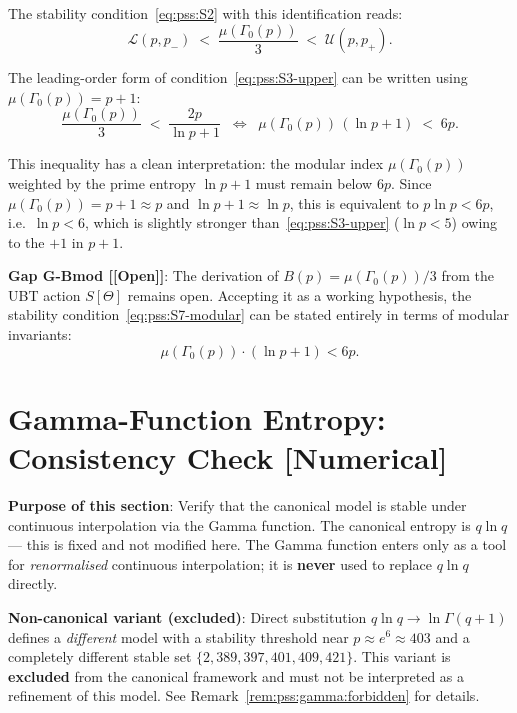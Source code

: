 \documentclass[12pt,a4paper]{article}
\theoremstyle{definition}
\theoremstyle{remark}
\newcommand{\OPEN}{\textbf{[Open]}}
\begin{document}
The stability condition~\eqref{eq:pss:S2} with this identification reads:
\[
  \mathcal{L}(p,p_-) \;<\; \frac{\mu(\Gamma_0(p))}{3} \;<\; \mathcal{U}(p,p_+).
  \tag{S7}
  \label{eq:pss:S7}
\]

The leading-order form of condition~\eqref{eq:pss:S3-upper} can be written using
$\mu(\Gamma_0(p)) = p+1$:
\[
  \frac{\mu(\Gamma_0(p))}{3} \;<\; \frac{2p}{\ln p + 1}
  \;\;\Longleftrightarrow\;\;
  \mu(\Gamma_0(p))\,(\ln p + 1) \;<\; 6p.
  \label{eq:pss:S7-modular}
\]

This inequality has a clean interpretation: the modular index $\mu(\Gamma_0(p))$
weighted by the prime entropy $\ln p + 1$ must remain below $6p$.  Since
$\mu(\Gamma_0(p)) = p+1 \approx p$ and $\ln p + 1 \approx \ln p$, this is
equivalent to $p \ln p < 6p$, i.e.\ $\ln p < 6$, which is slightly stronger
than~\eqref{eq:pss:S3-upper} ($\ln p < 5$) owing to the $+1$ in $p+1$.

\begin{gapbox}
\textbf{Gap G-Bmod [\OPEN]}: The derivation of $B(p) = \mu(\Gamma_0(p))/3$
from the UBT action $S[\Theta]$ remains open.  Accepting it as a working
hypothesis, the stability condition~\eqref{eq:pss:S7-modular} can be stated
entirely in terms of modular invariants:
\[
  \mu(\Gamma_0(p)) \cdot (\ln p + 1) < 6p.
\]
\end{gapbox}

\section{Gamma-Function Entropy: Consistency Check \textnormal{[Numerical]}}
\label{sec:pss:gamma}

\begin{infobox}
\textbf{Purpose of this section}: Verify that the canonical model is stable
under continuous interpolation via the Gamma function.
The canonical entropy is $q\ln q$ — this is fixed and not modified here.
The Gamma function enters only as a tool for \emph{renormalised} continuous
interpolation; it is \textbf{never} used to replace $q\ln q$ directly.

\medskip
\textbf{Non-canonical variant (excluded)}: Direct substitution
$q\ln q \to \ln\Gamma(q+1)$ defines a \emph{different} model with a
stability threshold near $p \approx e^6 \approx 403$ and a completely
different stable set $\{2,389,397,401,409,421\}$.
This variant is \textbf{excluded} from the canonical framework and must
not be interpreted as a refinement of this model.
See Remark~\ref{rem:pss:gamma:forbidden} for details.
\end{infobox}
\end{document}
